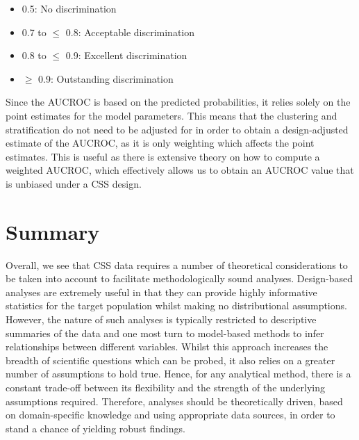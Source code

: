 \begin{itemize}
\item 0.5: No discrimination
\item 0.7 to $\leq$ 0.8: Acceptable discrimination
\item 0.8 to $\leq$ 0.9: Excellent discrimination
\item $\geq$ 0.9: Outstanding discrimination 
\end{itemize}

Since the AUCROC is based on the predicted probabilities, it relies solely on the point estimates for the model parameters. This means that the clustering and stratification do not need to be adjusted for in order to obtain a design-adjusted estimate of the AUCROC, as it is only weighting which affects the point estimates. This is useful as there is extensive theory on how to compute a weighted AUCROC, which effectively allows us to obtain an AUCROC value that is unbiased under a CSS design.

\section{Summary}

Overall, we see that CSS data requires a number of theoretical considerations to be taken into account to facilitate methodologically sound analyses. Design-based analyses are extremely useful in that they can provide highly informative statistics for the target population whilst making no distributional assumptions. However, the nature of such analyses is typically restricted to descriptive summaries of the data and one most turn to model-based methods to infer relationships between different variables. Whilst this approach increases the breadth of scientific questions which can be probed, it also relies on a greater number of assumptions to hold true. Hence, for any analytical method, there is a constant trade-off between its flexibility and the strength of the underlying assumptions required. Therefore, analyses should be theoretically driven, based on domain-specific knowledge and using appropriate data sources, in order to stand a chance of yielding robust findings.
